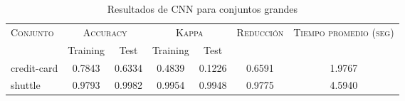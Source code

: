 \begin{table}[]
\centering
\begin{tabular}{l c c c c c c}
\hline
\multirow{2}{*}{\textsc{Conjunto}}
	& \multicolumn{2}{c}{\textsc{Accuracy}}
	& \multicolumn{2}{c}{\textsc{Kappa}}
	& \textsc{Reducción}
	& \textsc{Tiempo promedio (seg)} \\
	& Training & Test
	& Training & Test \\ 
\hline
\hline

credit-card & 0.7843 & 0.6334 & 0.4839 & 0.1226 & 0.6591 & 1.9767 \\
shuttle & 0.9793 & 0.9982 & 0.9954 & 0.9948 & 0.9775 & 4.5940 \\

\hline
\end{tabular}
\caption{Resultados de CNN para conjuntos grandes }
\label{res-large-cnn}
\end{table}

